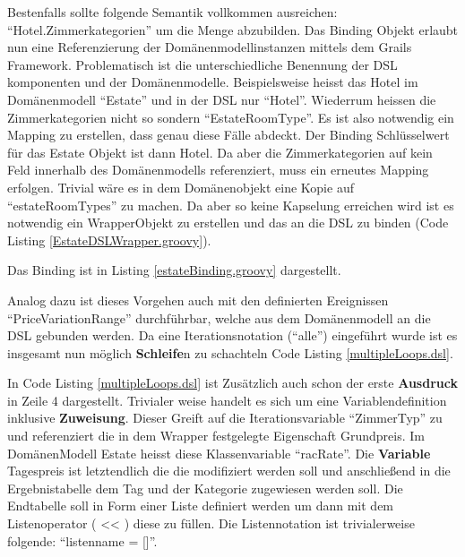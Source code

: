 \documentclass[11pt,english,ngerman, headsepline]{scrreprt}
\begin{document}
Bestenfalls sollte folgende Semantik vollkommen ausreichen:
``Hotel.Zimmerkategorien'' um die Menge abzubilden.
Das Binding Objekt erlaubt nun eine Referenzierung der Domänenmodellinstanzen
mittels dem Grails Framework. Problematisch ist die unterschiedliche Benennung
der DSL komponenten und der Domänenmodelle. Beispielsweise heisst das Hotel im
Domänenmodell ``Estate'' und in der DSL nur ``Hotel''. Wiederrum heissen die
Zimmerkategorien nicht so sondern ``EstateRoomType''. Es ist also notwendig ein
Mapping zu erstellen, dass genau diese Fälle abdeckt. Der Binding Schlüsselwert
für das Estate Objekt ist dann Hotel. 
Da aber die Zimmerkategorien auf kein Feld innerhalb des Domänenmodells
referenziert, muss ein erneutes Mapping erfolgen. Trivial wäre es in dem
Domänenobjekt eine Kopie auf ``estateRoomTypes'' zu machen. Da aber so keine
Kapselung erreichen wird ist es notwendig ein WrapperObjekt zu erstellen und das
an die DSL zu binden (Code Listing \ref{EstateDSLWrapper.groovy}).
 



Das Binding ist in Listing \ref{estateBinding.groovy} dargestellt.



Analog dazu ist dieses Vorgehen auch mit den definierten Ereignissen
``PriceVariationRange'' durchführbar, welche aus dem Domänenmodell an die DSL
gebunden werden. Da eine Iterationsnotation (``alle'') eingeführt wurde ist es
insgesamt nun möglich {\bf Schleife}n zu schachteln Code Listing
\ref{multipleLoops.dsl}.
 


In Code Listing \ref{multipleLoops.dsl} ist Zusätzlich auch schon der erste
{\bf Ausdruck} in Zeile 4 dargestellt. Trivialer weise handelt es sich um
eine Variablendefinition inklusive {\bf Zuweisung}. Dieser Greift auf
die Iterationsvariable ``ZimmerTyp'' zu und referenziert die in dem Wrapper
festgelegte Eigenschaft Grundpreis. Im DomänenModell Estate heisst diese
Klassenvariable ``racRate''.
Die {\bf Variable} Tagespreis ist letztendlich die die modifiziert
werden soll und anschließend in die Ergebnistabelle dem Tag und der
Kategorie zugewiesen werden soll. Die Endtabelle soll in Form einer Liste
definiert werden um dann mit dem Listenoperator ( << ) diese
zu füllen. Die Listennotation ist trivialerweise folgende: ``listenname = []''.
\end{document}
